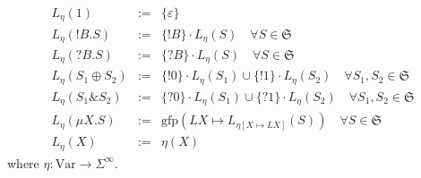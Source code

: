 \documentclass{llncs}
\newcommand*{\Var}{\mathrm{Var}}
\newcommand*{\Sy}{\mathfrak{S}}
\newcommand*{\gfp}{\mathrm{gfp}}
\newcommand*{\union}{\cup}
\newcommand*{\send}{\mathord{!}}
\newcommand*{\recv}{\mathord{?}}
\newcommand*{\echoice}{\oplus}
\newcommand*{\ichoice}{\mathop{\&}}
\newcommand*{\concat}{\cdot}
\renewcommand*{\|}{\;|\;}
\renewcommand*{\epsilon}{\varepsilon}
\begin{document}
\begin{definition}
  \label{def:trace_language}
  \begin{eqnarray}
    \label{def:trace_language:1}
    L_\eta(1)    &:=& \{ \epsilon \} \\
    \label{def:trace_language:send}
    L_\eta(\send B.S) &:=& \{ \send B \} \concat L_\eta(S) \quad \forall S \in \Sy \\
    \label{def:trace_language:recv}
    L_\eta(\recv B.S) &:=& \{ \recv B \} \concat L_\eta(S) \quad \forall S \in \Sy \\
    \label{def:trace_language:echoice}
    L_\eta(S_1 \echoice S_2)
      &:=&   \{ \send 0 \} \concat L_\eta(S_1)
      \union \{ \send 1 \} \concat L_\eta(S_2)
      \quad \forall S_1, S_2 \in \Sy \\
    \label{def:trace_language:ichoice}
    L_\eta(S_1 \ichoice S_2)
      &:=&   \{ \recv 0 \} \concat L_\eta(S_1)
      \union \{ \recv 1 \} \concat L_\eta(S_2)
      \quad \forall S_1, S_2 \in \Sy \\
    \label{def:trace_language:mu}
    L_\eta(\mu X.S) &:=& \gfp(LX \mapsto L_{\eta[X \mapsto LX]}(S))
      \quad \forall S \in \Sy \\
    \label{def:trace_language:var}
    L_\eta(X) &:=& \eta(X)
  \end{eqnarray}
  where $\eta\colon \Var \to \Sigma^\infty$.
\end{definition}
\end{document}

